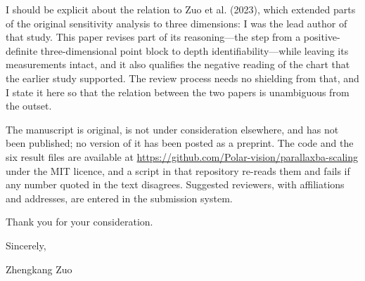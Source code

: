 \documentclass[10pt,a4paper]{article}
\begin{document}
I should be explicit about the relation to Zuo et al. (2023), which extended parts of the original sensitivity analysis to three dimensions: I was the lead author of that study. This paper revises part of its reasoning---the step from a positive-definite three-dimensional point block to depth identifiability---while leaving its measurements intact, and it also qualifies the negative reading of the chart that the earlier study supported. The review process needs no shielding from that, and I state it here so that the relation between the two papers is unambiguous from the outset.

The manuscript is original, is not under consideration elsewhere, and has not been published; no version of it has been posted as a preprint. The code and the six result files are available at \url{https://github.com/Polar-vision/parallaxba-scaling} under the MIT licence, and a script in that repository re-reads them and fails if any number quoted in the text disagrees. Suggested reviewers, with affiliations and addresses, are entered in the submission system.

\bigskip
\noindent Thank you for your consideration.

\bigskip
\noindent Sincerely,

\vspace{16pt}
\noindent Zhengkang Zuo
\end{document}
